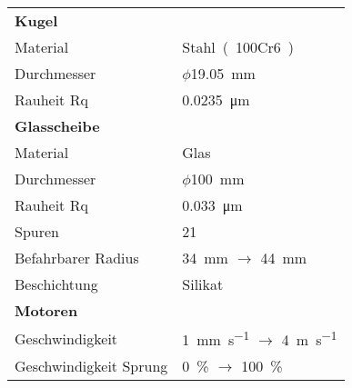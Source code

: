 \begin{table}[htb]
    \centering
    \begin{tabular}{m{5cm}l}
        \textbf{Kugel}          &                                                                                                           \\
        Material                & \si{Stahl~(100Cr6)}                                                                                       \\
        Durchmesser             & $\phi$\SI{19.05}{\milli\meter}                                                                            \\
        Rauheit Rq              & \SI{0.0235}{\micro\meter}                                                                                 \\
        \hline
        \textbf{Glasscheibe}    &                                                                                                           \\
        Material                & \si{Glas}                                                                                                 \\
        Durchmesser             & $\phi$\SI{100}{\milli\meter}                                                                              \\
        Rauheit Rq              & \SI{0.033}{\micro\meter}                                                                                  \\
        Spuren                  & \num{21}                                                                                                  \\
        Befahrbarer Radius      & \SI{34}{\milli\meter} $\rightarrow$ \SI{44}{\milli\meter}                                                 \\
        Beschichtung            & \si{Silikat}                                                                                              \\
        \hline
        \textbf{Motoren}        &                                                                                                           \\
        Geschwindigkeit         & \SI[per-mode=symbol]{1}{\milli\meter\per\second} $\rightarrow$ \SI[per-mode=symbol]{4}{\meter\per\second} \\
        Geschwindigkeit Sprung  & \SI{0}{\percent} $\rightarrow$ \SI{100}{\percent}                                                         \\

\end{tabular}
\end{table}

